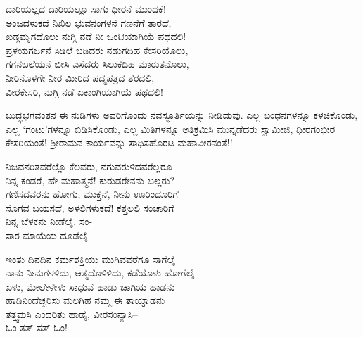 \begin{myquote}
ದಾರಿಯಲ್ಲದ ದಾರಿಯಲ್ಲೂ ಸಾಗು ಧೀರನೆ ಮುಂದಕೆ!\\ಅಂಜದಳುಕದೆ ನಿಖಿಲ ಭುವನಂಗಳನೆ ಗಣನೆಗೆ ತಾರದೆ,\\ಖಡ್ಗಮೃಗದೊಲು ನುಗ್ಗಿ ನಡೆ ನೀ ಒಂಟಿಯಾಗಿಯೆ ಪಥದಲಿ!\\ಪ್ರಳಯಗರ್ಜನೆ ಸಿಡಿಲೆ ಬಡಿದರು ನಡುಗದಿಹ ಕೇಸರಿಯೊಲು,\\ಗಗನಬಲೆಯನೆ ಬೀಸಿ ಎಸೆದರು ಸಿಲುಕದಿಹ ಮಾರುತನೊಲು,\\ನೀರಿನೊಳಗೇ ನೀರ ಮೀರಿದ ಪದ್ಮಪತ್ರದ ತೆರದಲಿ,\\ವೀರಕೇಸರಿ, ನುಗ್ಗಿ ನಡೆ ಏಕಾಂಗಿಯಾಗಿಯೆ ಪಥದಲಿ!
\end{myquote}

\noindent

ಬುದ್ಧಭಗವಂತನ ಈ ನುಡಿಗಳು ಅವರಿಗೊಂದು ನವಸ್ಫೂರ್ತಿಯನ್ನು ನೀಡಿದುವು. ಎಲ್ಲ ಬಂಧನಗಳನ್ನೂ ಕಳಚಿಕೊಂಡು, ಎಲ್ಲ ‘ಗಂಟು’ಗಳನ್ನೂ ಬಿಡಿಸಿಕೊಂಡು, ಎಲ್ಲ ಮಿತಿಗಳನ್ನೂ ಅತಿಕ್ರಮಿಸಿ ಮುನ್ನಡೆದರು ಸ್ವಾಮೀಜಿ, ಧೀರಗಂಭೀರ ಕೇಸರಿಯಂತೆ! ಶ್ರೀರಾಮನ ಕಾರ್ಯವನ್ನು ಸಾಧಿಸಹೊರಟ ಮಹಾವೀರನಂತೆ!!

\begin{myquote}
ನಿಜವನರಿತವರೆಲ್ಲೊ ಕೆಲವರು, ನಗುವರುಳಿದವರೆಲ್ಲರೂ\\ನಿನ್ನ ಕಂಡರೆ, ಹೇ ಮಹಾತ್ಮನೆ! ಕುರುಡರೇನನು ಬಲ್ಲರು?\\ಗಣಿಸದವರನು ಹೋಗು, ಮುಕ್ತನೆ, ನೀನು ಊರಿಂದೂರಿಗೆ\\ಸೊಗವ ಬಯಸದೆ, ಅಳಲಿಗಳುಕದೆ! ಕತ್ತಲಲಿ ಸಂಚಾರಿಗೆ\\ನಿನ್ನ ಬೆಳಕನು ನೀಡೆಲೈ, ಸಂ-\\ಸಾರ ಮಾಯೆಯ ದೂಡೆಲೈ
\end{myquote}

\begin{myquote}
ಇಂತು ದಿನದಿನ ಕರ್ಮಶಕ್ತಿಯು ಮುಗಿವವರೆಗೂ ಸಾಗೆಲೈ\\ನಾನು ನೀನುಗಳಳಿದು, ಆತ್ಮದೊಳಿಳಿದು, ಕಡೆಯೊಳು ಹೋಗೆಲೈ\\ಏಳು, ಮೇಲೇಳೇಳು ಸಾಧುವೆ ಹಾಡು ಚಾಗಿಯ ಹಾಡನು\\ಹಾಡಿನಿಂದೆಚ್ಚರಿಸು ಮಲಗಿಹ ನಮ್ಮ ಈ ತಾಯ್ನಾಡನು\\ತತ್ತ್ವಮಸಿ ಎಂದರಿತು ಹಾಡೈ, ವೀರಸಂನ್ಯಾಸಿ–\\ಓಂ ತತ್ ಸತ್ ಓಂ!
\end{myquote}

